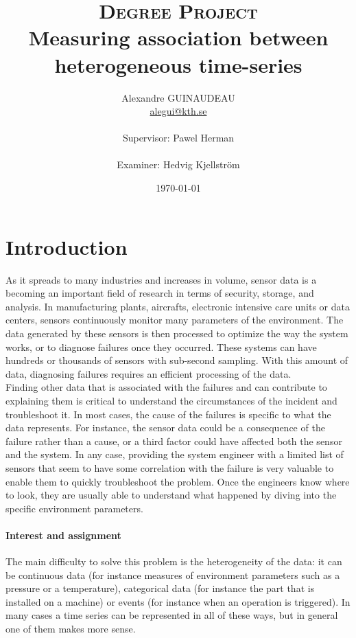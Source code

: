\documentclass[12pt,a4paper]{article}
\title{\textsc{Degree Project} \\
\large{\textbf{Measuring association between heterogeneous time-series}}}
\author{Alexandre GUINAUDEAU\\
\href{mailto:alegui@kth.se}{alegui@kth.se}\\
\\
Supervisor: Pawel Herman\\
\\
Examiner: Hedvig Kjellstr{\"o}m\\
}
\date{\today}
\begin{document}
\maketitle

\newpage

\tableofcontents

\newpage

\section*{Introduction}
\label{sec:intro}

As it spreads to many industries and increases in volume, sensor data is a becoming an important field of research in terms of security, storage, and analysis.
In manufacturing plants, aircrafts, electronic intensive care units or data centers, sensors continuously monitor many parameters of the environment.
The data generated by these sensors is then processed to optimize the way the system works, or to diagnose failures once they occurred.
These systems can have hundreds or thousands of sensors with sub-second sampling.
With this amount of data, diagnosing failures requires an efficient processing of the data.\\

Finding other data that is associated with the failures and can contribute to explaining them is critical to understand the circumstances of the incident and troubleshoot it.
In most cases, the cause of the failures is specific to what the data represents.
For instance, the sensor data could be a consequence of the failure rather than a cause, or a third factor could have affected both the sensor and the system.
In any case, providing the system engineer with a limited list of sensors that seem to have some correlation with the failure is very valuable to enable them to quickly troubleshoot the problem.
Once the engineers know where to look, they are usually able to understand what happened by diving into the specific environment parameters.

\paragraph{Interest and assignment}

The main difficulty to solve this problem is the heterogeneity of the data: it can be continuous data (for instance measures of environment parameters such as a pressure or a temperature), categorical data (for instance the part that is installed on a machine) or events (for instance when an operation is triggered). In many cases a time series can be represented in all of these ways, but in general one of them makes more sense.
\end{document}
